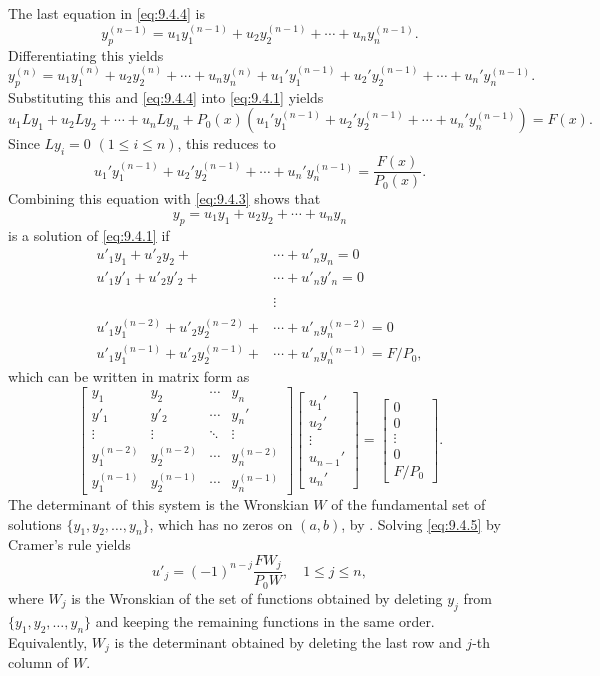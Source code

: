 The last equation in \eqref{eq:9.4.4} is
\[
y_p^{(n-1)}=u_1y_1^{(n-1)}+u_2y_2^{(n-1)}+\cdots+u_ny_n^{(n-1)}.
\]
Differentiating this yields
\[
y_p^{(n)}=u_1y_1^{(n)}+u_2y_2^{(n)}+\cdots+u_ny_n^{(n)}+
u_1'y_1^{(n-1)}+u_2'y_2^{(n-1)}+\cdots+u_n'y_n^{(n-1)}.
\]
Substituting this and  \eqref{eq:9.4.4} into \eqref{eq:9.4.1}
yields
\[
u_1Ly_1+u_2Ly_2+\cdots+u_nLy_n+P_0(x)\left(
u_1'y_1^{(n-1)}+u_2'y_2^{(n-1)}+\cdots+u_n'y_n^{(n-1)}\right)=F(x).
\]
Since  $Ly_i=0$ $(1 \le i \le n)$, this reduces to
\[
u_1'y_1^{(n-1)}+u_2'y_2^{(n-1)}+\cdots+u_n'y_n^{(n-1)}=\frac{F(x)}{P_0(x)}.
\]
Combining this equation with \eqref{eq:9.4.3} shows that
\[
y_p=u_1y_1+u_2y_2+\cdots+u_ny_n
\]
is a solution of \eqref{eq:9.4.1} if
\begin{align*}
u'_1y_1+u'_2y_2+&\cdots+u'_ny_n=0 \\
u'_1y'_1+u'_2y'_2+&\cdots+u'_ny'_n=0 \\
\phantom{u'_1y^{(n_1)}+u'_2y_2^{(n-1)}}&\vdots\\
u'_1y_1^{(n-2)}+u'_2y^{(n-2)}_2+&\cdots+u'_ny^{(n-2)}_n=0 \\
u'_1y^{(n-1)}_1+u'_2y^{(n-1)}_2+&\cdots+u'_n y^{(n-1)}_n=F/P_0,
\end{align*}
which can be written in matrix form as
\begin{equation} \label{eq:9.4.5}
\begin{bmatrix}
y_1&y_2&\cdots&y_n \\
y'_1&y'_2&\cdots&y_n'\\
\vdots&\vdots&\ddots&\vdots\\
y_1^{(n-2)}&y_2^{(n-2)}&\cdots&y_n^{(n-2)}\\
y_1^{(n-1)}&y_2^{(n-1)}&\cdots&y_n^{(n-1)}
\end{bmatrix}
\begin{bmatrix}u_1'\\u_2'\\\vdots\\u_{n-1}'\\u_n'\end{bmatrix}=
\begin{bmatrix}0\\0\\ \vdots\\0\\F/ P_0\end{bmatrix}.
\end{equation}
The determinant of this system is the Wronskian $W$ of
the fundamental set of solutions $\{y_1,y_2,\dots,y_n\}$,
which has no zeros on $(a,b)$, by .
Solving
\eqref{eq:9.4.5} by Cramer's rule yields
\begin{equation}\label{eq:9.4.6}
u'_j=(-1)^{n-j}\frac{FW_j}{P_0W},\quad 1\le j\le n,
\end{equation}
 where $W_j$ is the Wronskian of the set of
functions obtained by deleting $y_j$ from  $\{y_1,y_2,\dots,y_n\}$
 and keeping the remaining functions in the
same order. Equivalently, $W_j$ is the determinant obtained by
deleting the last row and $j$-th column of $W$.

